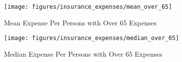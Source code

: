 \documentclass{ucetd}
\begin{document}
\begin{figure}[!ht]
\centering
\texttt{[image: figures/insurance\_expenses/mean\_over\_65]}
\caption{Mean Expense Per Persons with Over 65 Expenses}
\label{fig:insurance_expenses_mean_over_65}
\end{figure}

\begin{figure}[!ht]
\centering
\texttt{[image: figures/insurance\_expenses/median\_over\_65]}
\caption{Median Expense Per Persons with Over 65 Expenses}
\label{fig:insurance_expenses_median_over_65}
\end{figure}


%
\end{document}
